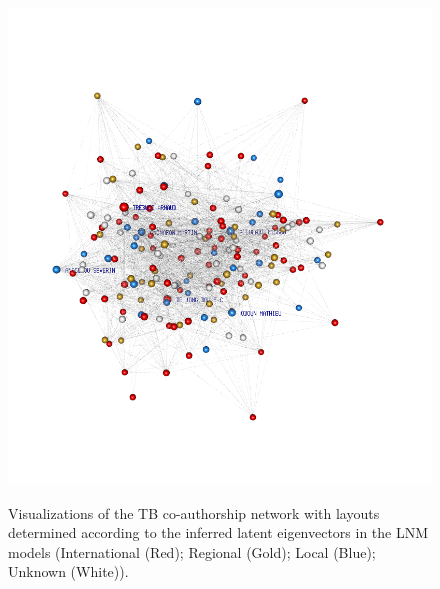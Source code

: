 \begin{figure}[!h]
\vspace{2px}\\
\includegraphics[scale=0.2,trim={5cm 5cm 5cm 5cm}]{Chapters/tb/statMod/lnm_mod7_All.png}
\caption{Visualizations of the TB co-authorship network with layouts determined according to the inferred latent eigenvectors in the LNM models (International (Red); Regional (Gold); Local (Blue); Unknown (White)).
}
\label{fig:tb_lnm_viz}
\end{figure}

